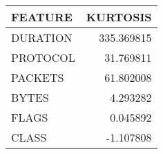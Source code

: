 \begin{tabular}{lr}
\toprule
 FEATURE &   KURTOSIS \\
\midrule
DURATION & 335.369815 \\
PROTOCOL &  31.769811 \\
 PACKETS &  61.802008 \\
   BYTES &   4.293282 \\
   FLAGS &   0.045892 \\
   CLASS &  -1.107808 \\
\bottomrule
\end{tabular}
